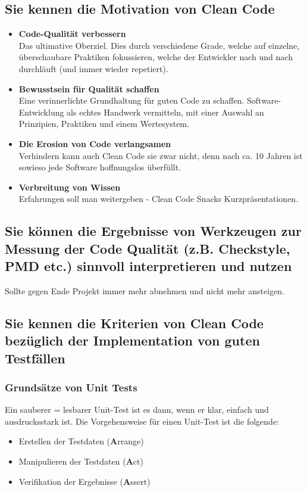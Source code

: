 \subsection{Sie kennen die Motivation von Clean Code}
\begin{itemize}
  \item \textbf{Code-Qualität verbessern} \\
  Das ultimative Oberziel. Dies durch verschiedene Grade, welche auf einzelne, überschaubare Praktiken fokussieren, welche der Entwickler nach und nach durchläuft (und immer wieder repetiert).
  \item \textbf{Bewusstsein für Qualität schaffen} \\
  Eine verinnerlichte Grundhaltung für guten Code zu schaffen. Software-Entwicklung als echtes Handwerk vermitteln, mit einer Auswahl an Prinzipien, Praktiken und einem Wertesystem.
  \item \textbf{Die Erosion von Code verlangsamen} \\
   Verhindern kann auch Clean Code sie zwar nicht, denn nach ca. 10 Jahren ist sowieso jede Software hoffnungslos überfüllt. 
   \item \textbf{Verbreitung von Wissen} \\
   Erfahrungen soll man weitergeben - Clean Code Snacks Kurzpräsentationen.
\end{itemize}

\subsection{Sie können die Ergebnisse von Werkzeugen zur Messung der Code Qualität (z.B. Checkstyle, PMD etc.) sinnvoll interpretieren und nutzen}

Sollte gegen Ende Projekt immer mehr abnehmen und nicht mehr ansteigen.

\subsection{Sie kennen die Kriterien von Clean Code bezüglich der Implementation von guten Testfällen}

\subsubsection{Grundsätze von Unit Tests}
Ein sauberer = lesbarer Unit-Test ist es dann, wenn er klar, einfach und ausdrucksstark ist. Die Vorgehensweise für einen Unit-Test ist die folgende:
\begin{itemize}
  \item Erstellen der Testdaten (\textbf{A}rrange)
  \item Manipulieren der Testdaten (\textbf{A}ct)
  \item Verifikation der Ergebnisse (\textbf{A}ssert)
\end{itemize}

